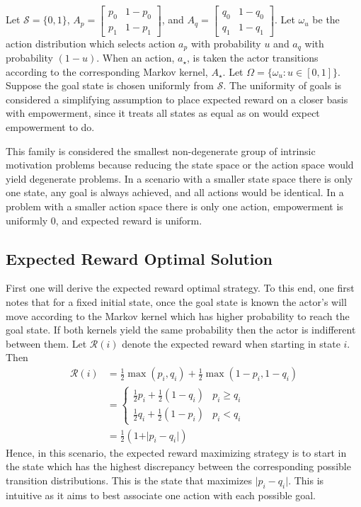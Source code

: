 \documentclass{article}
\newcommand{\Ss}{\mathcal{S}}
\newcommand{\Rr}{\mathcal{R}}
\begin{document}
Let $\Ss=\{0,1\}$, $A_p=\left[\begin{matrix} p_0 & 1-p_0 \\ p_1 & 1-p_1\end{matrix}\right]$, and $A_q=\left[\begin{matrix} q_0 & 1-q_0 \\ q_1 & 1-q_1\end{matrix}\right]$. Let $\omega_u$ be the action distribution which selects action $a_p$ with probability $u$ and $a_q$ with probability $(1-u)$. When an action, $a_\star$, is taken the actor transitions according to the corresponding Markov kernel, $A_\star$. Let $\Omega=\{\omega_u:u\in[0,1]\}$. Suppose the goal state is chosen uniformly from $\Ss$. The uniformity of goals is considered a simplifying assumption to place expected reward on a closer basis with empowerment, since it treats all states as equal as on would expect empowerment to do.

This family is considered the smallest non-degenerate group of intrinsic motivation problems because reducing the state space or the action space would yield degenerate problems. In a scenario with a smaller state space there is only one state, any goal is always achieved, and all actions would be identical. In a problem with a smaller action space there is only one action, empowerment is uniformly $0$, and expected reward is uniform. 

\subsection{Expected Reward Optimal Solution}
First one will derive the expected reward optimal strategy. To this end, one first notes that for a fixed initial state, once the goal state is known the actor's will move according to the Markov kernel which has higher probability to reach the goal state. If both kernels yield the same probability then the actor is indifferent between them. Let $\Rr(i)$ denote the expected reward when starting in state $i$. Then
\begin{align*}
\Rr(i) 
	&= \frac{1}{2} \max(p_i,q_i) +\frac{1}{2} \max(1-p_i,1-q_i)\\
	&=\begin{cases}
		\frac{1}{2} p_i +\frac{1}{2} (1-q_i) & p_i\geq q_i\\
		\frac{1}{2} q_i +\frac{1}{2} (1-p_i) & p_i < q_i
		\end{cases}\\
	&=\frac{1}{2}(1+\vert p_i - q_i \vert) 	
\end{align*}
Hence, in this scenario, the expected reward maximizing strategy is to start in the state which has the highest discrepancy between the corresponding possible transition distributions. This is the state that maximizes $\vert p_i-q_i\vert$. This is intuitive as it aims to best associate one action with  each possible goal. 
\end{document}
